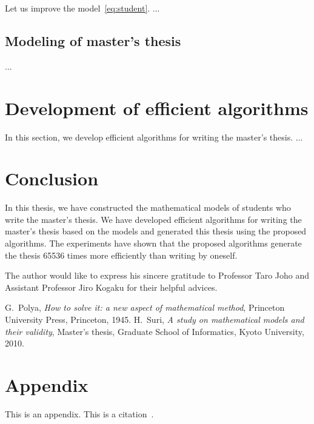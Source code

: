 \documentclass[english]{ampmt}             %
\begin{document}
Let us improve the model~\eqref{eq:student}.
...

\subsection{Modeling of master's thesis}
...

\section{Development of efficient algorithms}
In this section, we develop efficient algorithms for writing the master's thesis.
...

\section{Conclusion}
In this thesis, we have constructed the mathematical models of students
who write the master's thesis.
We have developed efficient algorithms for writing the master's thesis
based on the models and generated this thesis using the proposed algorithms.
The experiments have shown that the proposed algorithms generate the thesis
65536 times more efficiently than writing by oneself.

\acknowledgment
The author would like to express his sincere gratitude to Professor
Taro Joho and Assistant Professor Jiro Kogaku for their helpful advices.

\begin{thebibliography}{10}
  G.~Polya, \textit{How to solve it: a new aspect of mathematical method},
  Princeton University Press, Princeton, 1945.
  H.~Suri, \textit{A study on mathematical models and their validity},
  Master's thesis, Graduate School of Informatics, Kyoto University, 2010.
\end{thebibliography}

\appendix

\section{Appendix}
This is an appendix. This is a citation~\cite{polya1945}.
\end{document}
